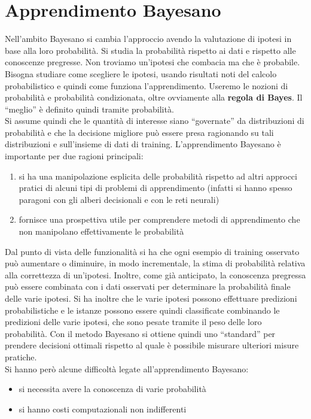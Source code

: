 \documentclass[a4paper,12pt, oneside]{book}
\begin{document}
\chapter{Apprendimento Bayesano}
Nell'ambito Bayesano si cambia l'approccio avendo la valutazione di ipotesi in
base alla loro probabilità. Si studia la probabilità rispetto ai dati e rispetto
alle conoscenze pregresse. Non troviamo un'ipotesi che combacia ma che è
probabile.\\
Bisogna studiare come scegliere le ipotesi, usando risultati noti del calcolo
probabilistico e quindi come funziona l'apprendimento. Useremo le nozioni di
probabilità e probabilità condizionata, oltre ovviamente alla \textbf{regola di
  Bayes}. Il ``meglio'' è definito quindi tramite probabilità.\\
Si assume quindi che le quantità di interesse siano ``governate'' da
distribuzioni di probabilità e che la decisione migliore può essere presa
ragionando su tali distribuzioni e sull'insieme di dati di
training. L'apprendimento Bayesano è importante per due ragioni principali:
\begin{enumerate}
  \item si ha una manipolazione esplicita delle probabilità rispetto ad altri
  approcci pratici di alcuni tipi di problemi di apprendimento (infatti si hanno
  spesso paragoni con gli alberi decisionali e con le reti neurali)
  \item fornisce una prospettiva utile per comprendere metodi di apprendimento
  che non manipolano effettivamente le probabilità
\end{enumerate}
Dal punto di vista delle funzionalità si ha che ogni esempio di training
osservato può aumentare o diminuire, in modo incrementale, la stima di
probabilità relativa alla correttezza di un'ipotesi. Inoltre, come già
anticipato, la conoscenza pregressa può essere combinata con i dati osservati
per determinare la probabilità finale delle varie ipotesi. Si ha inoltre che le
varie ipotesi possono effettuare predizioni probabilistiche e le istanze possono
essere quindi classificate combinando le predizioni delle varie ipotesi, che
sono pesate tramite il peso delle loro probabilità. Con il metodo Bayesano si
ottiene quindi uno ``standard'' per prendere decisioni ottimali rispetto al
quale è possibile misurare ulteriori misure pratiche.\\
Si hanno però alcune difficoltà legate all'apprendimento Bayesano:
\begin{itemize}
  \item si necessita avere la conoscenza di varie probabilità
  \item si hanno costi computazionali non indifferenti
\end{itemize}
\end{document}
